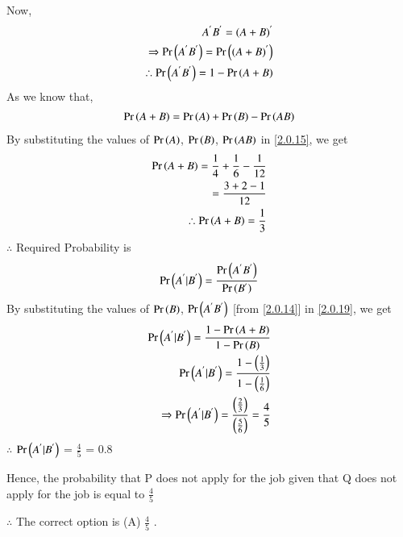 Now,
\begin{align}
A^{'}B^{'} = (A + B)^{'} \\
\Rightarrow \pr{A^{'}B^{'}} = \pr{(A + B)^{'}} \\
\therefore \pr{A^{'}B^{'}} = 1 - \pr{A + B} \label{2.0.14}
\end{align}
As we know that,
\begin{align}
\pr{A+B} = \pr{A} + \pr{B} - \pr{AB} \label{2.0.15}
\end{align}
By substituting the values of $\Pr\left(A\right)$, $\Pr\left(B\right)$, $\Pr\left(AB\right)$ in \eqref{2.0.15}, we get
\begin{align}
\Pr\left(A+B\right) = \frac{1}{4} + \frac{1}{6} - \frac{1}{12} \\
= \frac{3 + 2 - 1}{12} \\
\therefore \Pr\left(A+B\right) = \frac{1}{3}
\end{align}
$\therefore$ Required Probability is 
\begin{align}
\pr{A^{'}|B^{'}} = \frac{\pr{A^{'}B^{'}}}{\pr{B^{'}}} \label{2.0.19}   
\end{align}
By substituting the values of $\Pr\left(B\right)$, $\Pr\left(A^{'}B^{'}\right)$ [from \eqref{2.0.14}] in \eqref{2.0.19}, we get
\begin{align}
\Pr\left(A^{'}|B^{'}\right) = \frac{1 - \Pr\left(A + B\right)}{1 - \Pr\left(B\right)} \\
\Pr\left(A^{'}|B^{'}\right) = \frac{1 - \left(\frac{1}{3} \right)}{1 - \left(\frac{1}{6} \right)} \\
\Rightarrow \Pr\left(A^{'}|B^{'}\right) = \frac{\left(\frac{2}{3} \right)}{\left(\frac{5}{6} \right)} = \frac{4}{5}\\
\end{align}
$\therefore$ $\Pr\left(A^{'}|B^{'}\right)$ = $\frac{4}{5}$ = 0.8

Hence, the probability that P does not apply for the job given that Q does not apply for the job is equal to $\frac{4}{5}$

$\therefore$ The correct option is (A) $\frac{4}{5}$ .

